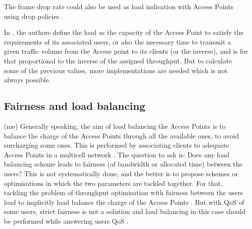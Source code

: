 \documentclass[journal,transmag]{IEEEtran}
\begin{document}
The frame drop rate could also be used as load indication with Access Points using drop policies \cite{11stability_fairness_APselection_game}.

In \cite{04Fairness_load_balancing_WLAN}, the authors define the load as the capacity of the Access Point to satisfy the requirements of its associated users, or also the necessary time to transmit a given traffic volume from the Access point to its clients (or the inverse), and is for that proportional to the inverse of the assigned throughput.  
But to calculate some of the previous values, more implementations are needed which is not always possible.

\subsection{Fairness and load balancing} (me)
Generally speaking, the aim of load balancing the Access Points is to balance the charge of the Access Points through all the available ones, to avoid surcharging some ones. This is performed by associating clients to adequate Access Points in a multicell network \cite{15fuzzy_load_balancing_802.11}. The question to ask is: Does any load balancing scheme leads to fairness (of bandwidth or allocated time) between the users? This is not systematically done, and the better is to propose schemes or optimisations in which the two parameters are tackled together. For that, tackling the problem of throughput optimisation with fairness between the users lead to implicitly load balance the charge of the Access Points \cite{08proportional_fairness_multiRate_LAN}. But with QoS of some users, strict fairness is not a solution and load balancing in this case should be performed while answering users QoS \cite{15fuzzy_load_balancing_802.11,07optimal_association_MSWIM}.
 
\end{document}
